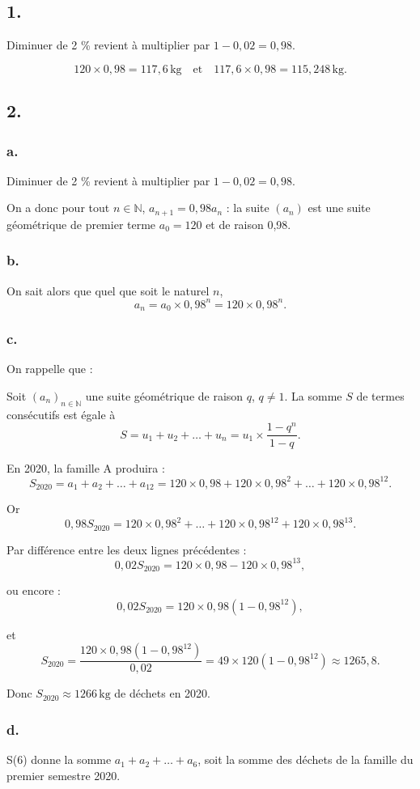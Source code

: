 \subsection*{1.}
	
	Diminuer de 2 \% revient à multiplier par \(1 - 0,02 = 0,98\).
	
	\[
	120 \times 0,98 = 117,6 \, \text{kg} \quad \text{et} \quad 117,6 \times 0,98 = 115,248 \, \text{kg}.
	\]
	
	\subsection*{2.}
	\subsubsection*{a.}
	Diminuer de 2 \% revient à multiplier par \(1 - 0,02 = 0,98\).
	
	On a donc pour tout \(n \in \mathbb{N}\), \(a_{n+1} = 0,98a_n\) : la suite \((a_n)\) est une suite géométrique de premier terme \(a_0 = 120\) et de raison 0,98.
	
	\subsubsection*{b.}
	
	On sait alors que quel que soit le naturel \(n\),
	\[
	a_n = a_0 \times 0,98^n = 120 \times 0,98^n.
	\]
	
	\subsubsection*{c.}
	
	On rappelle que :
	
	Soit \((a_n)_{n \in \mathbb{N}}\) une suite géométrique de raison \(q\), \(q \neq 1\). La somme \(S\) de termes consécutifs est égale à
	\[
	S = u_1 + u_2 + \ldots + u_n = u_1 \times \dfrac{1 - q^n}{1 - q}.
	\]
	
	En 2020, la famille A produira :
	\[
	S_{2020} = a_1 + a_2 + \ldots + a_{12} = 120 \times 0,98 + 120 \times 0,98^2 + \ldots + 120 \times 0,98^{12}.
	\]
	
	Or
	\[
	0,98S_{2020} = 120 \times 0,98^2 + \ldots + 120 \times 0,98^{12} + 120 \times 0,98^{13}.
	\]
	
	Par différence entre les deux lignes précédentes :
	\[
	0,02S_{2020} = 120 \times 0,98 - 120 \times 0,98^{13},
	\]
	
	ou encore :
	\[
	0,02S_{2020} = 120 \times 0,98(1 - 0,98^{12}),
	\]
	
	et
	\[
	S_{2020} = \dfrac{120 \times 0,98(1 - 0,98^{12})}{0,02} = 49 \times 120 (1 - 0,98^{12}) \approx 1265,8.
	\]
	
	Donc \(S_{2020} \approx 1266 \, \text{kg}\) de déchets en 2020.
	
	\subsubsection*{d.}
	

	
	S(6) donne la somme \(a_1 + a_2 + \ldots + a_6\), soit la somme des déchets de la famille du premier semestre 2020.
